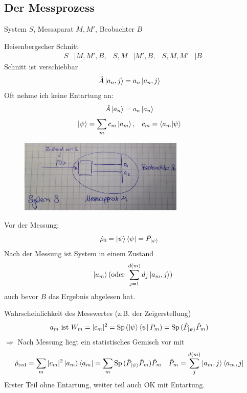 \subsection{Der Messprozess}
	System $S$, Messaparat $M, M'$, Beobachter $B$
	
	Heisenbergscher Schnitt
		\begin{align*}
			S &| M, M', B,& S,M &| M', B,& S, M, M' &| B 
		\end{align*}
	Schnitt ist verschiebbar
		\begin{align*}
			\hat{A} \ket{a_n, j} &= a_n \ket{a_n, j}
		\end{align*}
	Oft nehme ich keine Entartung an: 
		\begin{align*}
		\hat{A} \ket{a_n} &= a_n \ket{a_n}
		\end{align*}
		\begin{align*}
			\ket{\psi} &= \sum_m c_m \ket{a_m}, & c_m &= \braket{a_m | \psi}
		\end{align*}
	\begin{figure}
		\begin{center}
			\includegraphics[width=0.7\textwidth]{Messung1}
		\end{center}
	\end{figure}
	
	Vor der Messung: 
		\begin{align*}
			\hat{\rho}_0 &= \ket{\psi} \bra{\psi} = \hat{P}_{\ket{\psi}}
		\end{align*}
	Nach der Messung ist System in einem Zustand
		\begin{align*}
			\ket{a_m} (\text{oder } \sum_{j = 1}^{d(m)} d_j \ket{a_m, j})
		\end{align*}
	auch bevor $B$ das Ergebnis abgelesen hat.
	
	Wahrscheinlichkeit des Messwertes (z.B. der Zeigerstellung)
		\begin{align*}
			a_m \text{ ist } W_m &= |c_m|^2 = \mathrm{Sp}\, (\ket{\psi} \bra{\psi} P_m) = 
			\mathrm{Sp}\, (\hat{P}_{\ket{\psi}} \hat{P}_m)
		\end{align*}
	$\Rightarrow$ Nach Messung liegt ein statistisches Gemisch vor mit 
		\begin{align*}
			\hat{\rho}_{\text{red}} &= \sum_m |c_m|^2 \ket{a_m} \bra{a_m} =
			\sum_m \mathrm{Sp}\, (\hat{P}_{\ket{\psi}} \hat{P}_m) \hat{P}_m 
			& \hat{P}_m &= \sum_{j}^{d(m)} \ket{a_m, j} \bra{a_m, j}
		\end{align*}
	Erster Teil ohne Entartung, weiter teil auch OK mit Entartung.	
		
